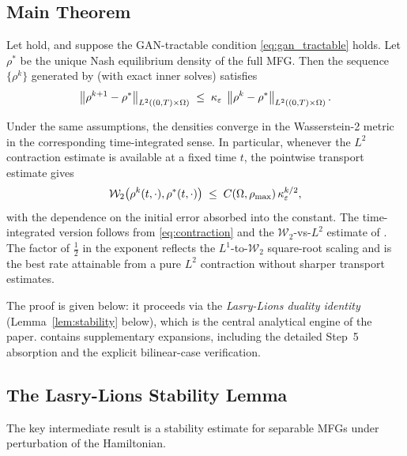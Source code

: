 \subsection{Main Theorem}

\begin{theorem}[$L^2$ contraction]\label{thm:main}
Let  hold,
and suppose the GAN-tractable condition \eqref{eq:gan_tractable} holds.
Let $\rho^*$ be the unique Nash equilibrium density of the full MFG.
Then the sequence $\{\rho^k\}$ generated by 
(with exact inner solves) satisfies
\begin{equation}\label{eq:contraction}
  \left\lVert \rho^{k+1} - \rho^* \right\rVert_{L^2((0,T)\times\Omega)}
  \;\leq\;
  \kappa_\varepsilon\;\left\lVert \rho^k - \rho^* \right\rVert_{L^2((0,T)\times\Omega)}.
\end{equation}
\end{theorem}

\begin{corollary}\label{cor:W2}
Under the same assumptions, the densities converge in the Wasserstein-2
metric in the corresponding time-integrated sense.  In particular, whenever
the $L^2$ contraction estimate is available at a fixed time $t$, the pointwise
transport estimate gives
\[
  \mathcal{W}_2\bigl(\rho^k(t,\cdot),\rho^*(t,\cdot)\bigr)
  \;\leq\; C(\Omega,\rho_{\max})\,\kappa_\varepsilon^{k/2},
\]
with the dependence on the initial error absorbed into the constant.
The time-integrated version follows from \eqref{eq:contraction} and the
$\mathcal{W}_2$-vs-$L^2$ estimate of .
The factor of $\tfrac{1}{2}$ in the exponent reflects the
$L^1$-to-$\mathcal{W}_2$ square-root scaling and is the best rate
attainable from a pure $L^2$ contraction without sharper transport
estimates.
\end{corollary}

The proof is given below: it proceeds via the
\emph{Lasry-Lions duality identity} (Lemma~\ref{lem:stability} below),
which is the central analytical engine of the paper.
 contains supplementary expansions, including the
detailed Step~5 absorption and the explicit bilinear-case verification.

\subsection{The Lasry-Lions Stability Lemma}

The key intermediate result is a stability estimate for separable MFGs
under perturbation of the Hamiltonian.

